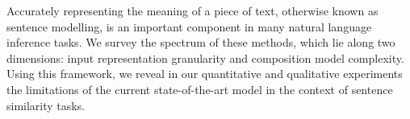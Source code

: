 Accurately representing the meaning of a piece of text, otherwise known as sentence modelling, is an important component in many natural language inference tasks. We survey the spectrum of these methods, which lie along two dimensions: input representation granularity and composition model complexity. Using this framework, we reveal in our quantitative and qualitative experiments the limitations of the current state-of-the-art model in the context of sentence similarity tasks.
